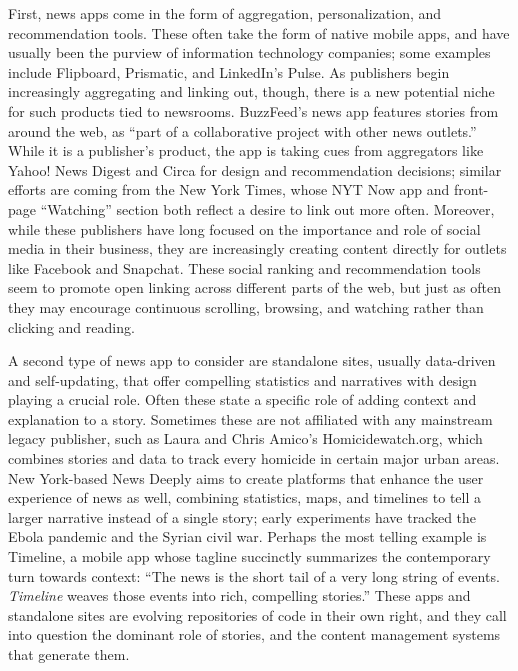 First, news apps come in the form of aggregation, personalization, and recommendation tools. These often take the form of native mobile apps, and have usually been the purview of information technology companies; some examples include Flipboard, Prismatic, and LinkedIn's Pulse. As publishers begin increasingly aggregating and linking out, though, there is a new potential niche for such products tied to newsrooms. BuzzFeed's news app features stories from around the web, as ``part of a collaborative project with other news outlets.''\autocite{odonovan_buzzfeed_2014} While it is a publisher's product, the app is taking cues from aggregators like Yahoo! News Digest and Circa for design and recommendation decisions; similar efforts are coming from the New York Times, whose NYT Now app and front-page ``Watching'' section both reflect a desire to link out more often. Moreover, while these publishers have long focused on the importance and role of social media in their business, they are increasingly creating content directly for outlets like Facebook and Snapchat.\autocite{isaac_facebook_2015} These social ranking and recommendation tools seem to promote open linking across different parts of the web, but just as often they may encourage continuous scrolling, browsing, and watching rather than clicking and reading.

A second type of news app to consider are standalone sites, usually data-driven and self-updating, that offer compelling statistics and narratives with design playing a crucial role. Often these state a specific role of adding context and explanation to a story. Sometimes these are not affiliated with any mainstream legacy publisher, such as Laura and Chris Amico's Homicidewatch.org, which combines stories and data to track every homicide in certain major urban areas. New York-based News Deeply aims to create platforms that enhance the user experience of news as well, combining statistics, maps, and timelines to tell a larger narrative instead of a single story; early experiments have tracked the Ebola pandemic and the Syrian civil war. Perhaps the most telling example is Timeline, a mobile app whose tagline succinctly summarizes the contemporary turn towards context: ``The news is the short tail of a very long string of events. \emph{Timeline} weaves those events into rich, compelling stories.''\autocite{_timeline_????} These apps and standalone sites are evolving repositories of code in their own right, and they call into question the dominant role of stories, and the content management systems that generate them.


